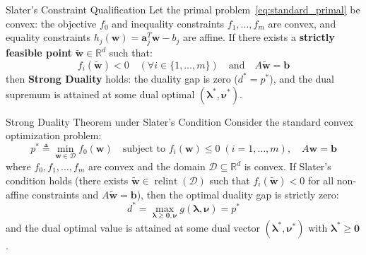 \begin{definitionbox}{Slater's Constraint Qualification}
Let the primal problem~\eqref{eq:standard_primal} be convex: the objective $f_0$ and inequality constraints $f_1, \dots, f_m$ are convex, and equality constraints $h_j(\mathbf{w}) = \mathbf{a}_j^T \mathbf{w} - b_j$ are affine.
If there exists a \textbf{strictly feasible point} $\tilde{\mathbf{w}} \in \mathbb{R}^d$ such that:
\begin{equation}
f_i(\tilde{\mathbf{w}}) < 0 \quad (\forall i \in \{1, \dots, m\}) \quad \text{and} \quad A\tilde{\mathbf{w}} = \mathbf{b}
\label{eq:slaters_condition}
\end{equation}
then \textbf{Strong Duality} holds: the duality gap is zero ($d^* = p^*$), and the dual supremum is attained at some dual optimal $(\boldsymbol{\lambda}^*, \boldsymbol{\nu}^*)$.
\end{definitionbox}

\begin{theorembox}{Strong Duality Theorem under Slater's Condition}
Consider the standard convex optimization problem:
\begin{equation}
p^* \triangleq \min_{\mathbf{w} \in \mathcal{D}} f_0(\mathbf{w}) \quad \text{subject to } f_i(\mathbf{w}) \le 0 \; (i = 1, \dots, m), \quad A\mathbf{w} = \mathbf{b}
\end{equation}
where $f_0, f_1, \dots, f_m$ are convex and the domain $\mathcal{D} \subseteq \mathbb{R}^d$ is convex.
If Slater's condition holds (there exists $\tilde{\mathbf{w}} \in \operatorname{relint}(\mathcal{D})$ such that $f_i(\tilde{\mathbf{w}}) < 0$ for all non-affine constraints and $A\tilde{\mathbf{w}} = \mathbf{b}$), then the optimal duality gap is strictly zero:
\begin{equation}
d^* = \max_{\boldsymbol{\lambda} \ge \mathbf{0}, \boldsymbol{\nu}} g(\boldsymbol{\lambda}, \boldsymbol{\nu}) = p^*
\label{eq:strong_duality_equality}
\end{equation}
and the dual optimal value is attained at some dual vector $(\boldsymbol{\lambda}^*, \boldsymbol{\nu}^*)$ with $\boldsymbol{\lambda}^* \ge \mathbf{0}$.
\end{theorembox}

